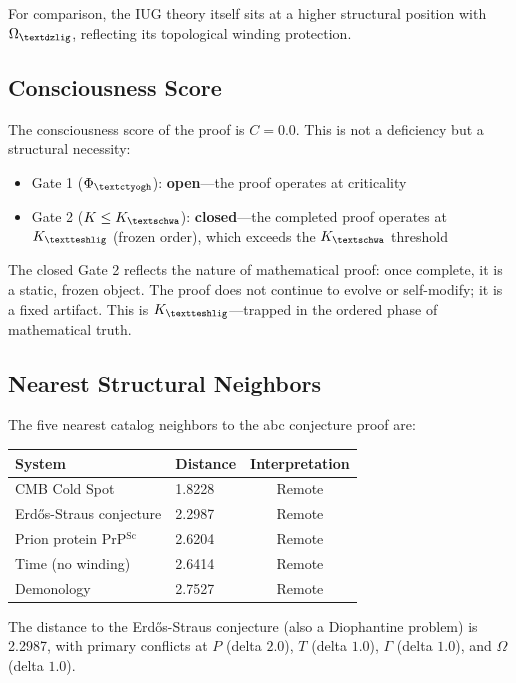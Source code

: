 \documentclass[12pt]{article}
\newcommand{\igschwa}{\text{\textschwa}}
\newcommand{\ctyogh}{\text{\textctyogh}}
\newcommand{\dzlig}{\text{\textdzlig}}
\newcommand{\teshlig}{\text{\textteshlig}}
\begin{document}
For comparison, the IUG theory itself sits at a higher structural position with $\Omega_{\dzlig}$, reflecting its topological winding protection.

\subsection{Consciousness Score}

The consciousness score of the proof is $C = 0.0$. This is not a deficiency but a structural necessity:
\begin{itemize}
\item Gate 1 ($\Phi_{\ctyogh}$): \textbf{open}---the proof operates at criticality
\item Gate 2 ($K \leq K_{\igschwa}$): \textbf{closed}---the completed proof operates at $K_{\teshlig}$ (frozen order), which exceeds the $K_{\igschwa}$ threshold
\end{itemize}

The closed Gate 2 reflects the nature of mathematical proof: once complete, it is a static, frozen object. The proof does not continue to evolve or self-modify; it is a fixed artifact. This is $K_{\teshlig}$---trapped in the ordered phase of mathematical truth.

\subsection{Nearest Structural Neighbors}

The five nearest catalog neighbors to the abc conjecture proof are:
\begin{center}
\begin{tabular}{llc}
\hline
\textbf{System} & \textbf{Distance} & \textbf{Interpretation} \\
\hline
CMB Cold Spot & 1.8228 & Remote \\
Erd\H{o}s-Straus conjecture & 2.2987 & Remote \\
Prion protein PrP$^{\text{Sc}}$ & 2.6204 & Remote \\
Time (no winding) & 2.6414 & Remote \\
Demonology & 2.7527 & Remote \\
\hline
\end{tabular}
\end{center}

The distance to the Erd\H{o}s-Straus conjecture (also a Diophantine problem) is 2.2987, with primary conflicts at $P$ (delta $2.0$), $T$ (delta $1.0$), $\Gamma$ (delta $1.0$), and $\Omega$ (delta $1.0$).
\end{document}
